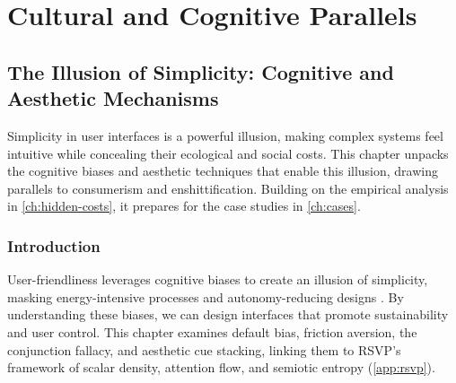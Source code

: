 \documentclass[openany]{book}
\begin{document}
\part{Cultural and Cognitive Parallels}

\chapter{The Illusion of Simplicity: Cognitive and Aesthetic Mechanisms}
\label{ch:illusion}

Simplicity in user interfaces is a powerful illusion, making complex systems feel intuitive while concealing their ecological and social costs. This chapter unpacks the cognitive biases and aesthetic techniques that enable this illusion, drawing parallels to consumerism and enshittification. Building on the empirical analysis in \cref{ch:hidden-costs}, it prepares for the case studies in \cref{ch:cases}.

\section{Introduction}
\label{sec:illusion-intro}
User-friendliness leverages cognitive biases to create an illusion of simplicity, masking energy-intensive processes and autonomy-reducing designs \citep{colak2024,doctorow2022}. By understanding these biases, we can design interfaces that promote sustainability and user control. This chapter examines default bias, friction aversion, the conjunction fallacy, and aesthetic cue stacking, linking them to RSVP’s framework of scalar density, attention flow, and semiotic entropy (\cref{app:rsvp}).
\end{document}
